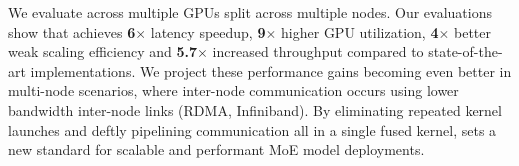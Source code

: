 We evaluate \sysname across multiple GPUs split across multiple nodes.
Our evaluations show that \sysname achieves \textbf{6}$\times$ latency speedup,
\textbf{9}$\times$ higher GPU utilization, \textbf{4}$\times$ better weak scaling efficiency and \textbf{5.7}$\times$
increased throughput compared to state-of-the-art implementations.
We project these performance gains becoming even better in multi-node scenarios,
where inter-node communication occurs using lower bandwidth inter-node links (\eg RDMA, Infiniband).
By eliminating repeated kernel launches and deftly pipelining communication all in a single fused kernel,
\sysname sets a new standard for scalable and performant MoE model deployments.
